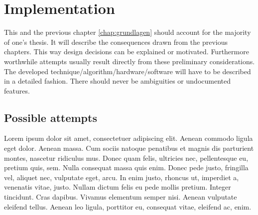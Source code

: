 \chapter{Implementation}
\label{chap:implementation}

This and the previous chapter \ref{chap:grundlagen} should account for the majority of one's thesis. It will describe the consequences drawn from the previous chapters. This way design decisions can be explained or motivated. Furthermore worthwhile attempts usually result directly from these preliminary considerations. The developed technique/algorithm/hardware/software will have to be described in a detailed fashion. There should never be ambiguities or undocumented features. 

\section{Possible attempts}
\label{sec:implementation_attempts}

Lorem ipsum dolor sit amet, consectetuer adipiscing elit. Aenean commodo ligula eget dolor. Aenean massa. Cum sociis natoque penatibus et magnis dis parturient montes, nascetur ridiculus mus. Donec quam felis, ultricies nec, pellentesque eu, pretium quis, sem. Nulla consequat massa quis enim. Donec pede justo, fringilla vel, aliquet nec, vulputate eget, arcu. In enim justo, rhoncus ut, imperdiet a, venenatis vitae, justo. Nullam dictum felis eu pede mollis pretium. Integer tincidunt. Cras dapibus. Vivamus elementum semper nisi. Aenean vulputate eleifend tellus. Aenean leo ligula, porttitor eu, consequat vitae, eleifend ac, enim.